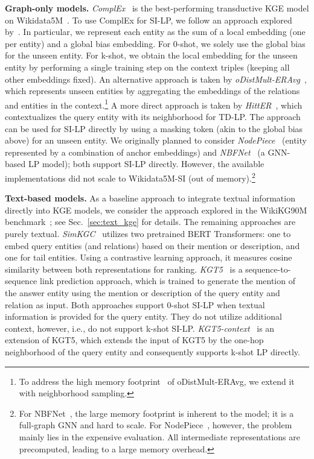 \documentclass[11pt]{article}
\renewcommand\:{\colon} \newcommand{\sset}[1]{\left\{\,#1\,\right\}} \newcommand{\ssets}[1]{\left\{#1\right\}} \newcommand{\ssetn}[1]{\{\,#1\,\}}
\begin{document}
\textbf{Graph-only models.} \emph{ComplEx}~\cite{trouillon2016complex} is
the best-performing transductive KGE model on
Wikidata5M~\cite{kochsiek2023start}. To use ComplEx for SI-LP, we follow an approach explored
by~\citet{jambor2021exploring}. In particular, we represent each entity as the
sum of a local embedding (one per entity) and a global bias embedding. For
0-shot, we solely use the global bias for the unseen entity. For k-shot, we
obtain the local embedding for the unseen entity by performing a single training
step on the context triples (keeping all other embeddings fixed). An
alternative approach is taken by \emph{oDistMult-ERAvg}~\cite{albooyeh2020out},
which represents unseen entities by aggregating the embeddings of the relations
and entities in the context.\footnote{To address the high memory
  footprint~\cite{galkin2021nodepiece} of oDistMult-ERAvg, we extend it with
  neighborhood sampling.}
A more direct approach is taken by \emph{HittER}~\cite{chen2021hitter}, which
contextualizes the query entity with its neighborhood for TD-LP. The approach
can be used for SI-LP directly by using a masking token (akin to the global
bias above) for an unseen entity.
We originally planned to consider \emph{NodePiece}~\cite{galkin2021nodepiece}
(entity represented by a combination of anchor embeddings) and
\emph{NBFNet}~\cite{nbfnet} (a GNN-based LP model); both support SI-LP directly.
However, the available implementations did not scale to Wikidata5M-SI (out of
memory).\footnote{For NBFNet~\cite{nbfnet}, the large memory footprint is inherent to the model; it is a full-graph GNN and hard to scale. For NodePiece~\cite{galkin2021nodepiece}, however, the problem mainly lies in the expensive evaluation. All intermediate representations are precomputed, leading to a large memory overhead.}


\textbf{Text-based models.} As a baseline approach to integrate textual
information directly into KGE models, we consider the approach explored in the
WikiKG90M benchmark~\cite{hu2021ogblsc}; see Sec.~\ref{sec:text_kge} for
details. The remaining approaches are purely textual.
\emph{SimKGC}~\cite{wang2022simkgc}
utilizes two pretrained BERT Transformers: one to embed query entities (and
relations) based on their mention or description, and one for tail entities.
Using a contrastive learning approach, it measures cosine similarity between
both representations for ranking.
\emph{KGT5}~\cite{saxena2022sequence} is a sequence-to-sequence link prediction
approach, which is trained to generate the mention of the answer entity using
the mention or description of the query entity and relation as input. Both
approaches support 0-shot SI-LP when textual information is provided for the
query entity. They do not utilize additional context, however, i.e., do not
support k-shot SI-LP. \emph{KGT5-context}~\cite{kochsiek2023friendly} is an
extension of KGT5, which extends the input of KGT5 by the one-hop neighborhood
of the query entity and consequently supports k-shot LP directly.
\end{document}
